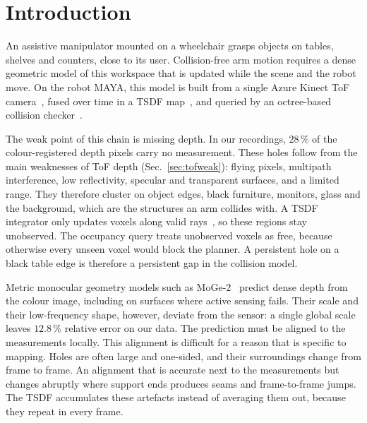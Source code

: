 \documentclass[conference]{IEEEtran}
\begin{document}
\section{Introduction}
\label{sec:intro}

An assistive manipulator mounted on a wheelchair grasps objects on tables,
shelves and counters, close to its user. Collision-free arm motion requires a
dense geometric model of this workspace that is updated while the scene and
the robot move. On the robot MAYA, this model is built from a single Azure
Kinect ToF camera~\cite{tolgyessy2021kinect}, fused over time in a TSDF
map~\cite{millane2024nvblox}, and queried by an octree-based collision
checker~\cite{pan2012fcl,carpentier2019pinocchio}.

The weak point of this chain is missing depth. In our recordings, \(28\,\%\)
of the colour-registered depth pixels carry no measurement. These holes follow
from the main weaknesses of ToF depth (Sec.~\ref{sec:tofweak}): flying pixels,
multipath interference, low reflectivity, specular and transparent surfaces,
and a limited range. They therefore cluster on object edges, black furniture,
monitors, glass and the background, which are the structures an arm collides
with. A TSDF integrator only updates voxels along valid
rays~\cite{curless1996volumetric}, so these regions stay unobserved. The
occupancy query treats unobserved voxels as free, because otherwise every
unseen voxel would block the planner. A persistent hole on a black table edge
is therefore a persistent gap in the collision model.

Metric monocular geometry models such as
MoGe-2~\cite{wang2025moge2} predict dense depth from the colour image, including
on surfaces where active sensing fails. Their scale and their low-frequency
shape, however, deviate from the sensor: a single global scale leaves
\(12.8\,\%\) relative error on our data. The prediction must be aligned to the
measurements locally. This alignment is difficult for a reason that is
specific to mapping. Holes are often large and one-sided, and their
surroundings change from frame to frame. An alignment that is accurate next
to the measurements but changes abruptly where support ends produces seams
and frame-to-frame jumps. The TSDF accumulates these artefacts instead of
averaging them out, because they repeat in every frame.
\end{document}
